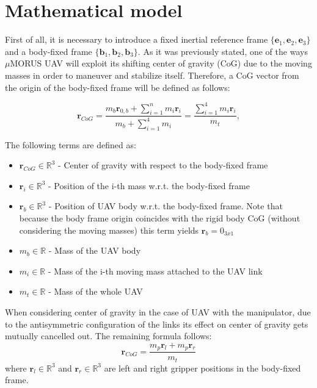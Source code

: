 \section{Mathematical model}
First of all, it is necessary to introduce a fixed inertial reference frame $\{  \textbf{e}_1,  \textbf{e}_2,  \textbf{e}_3  \}$ and a body-fixed frame $ \{  \textbf{b}_1,  \textbf{b}_2,  \textbf{b}_3 \}$. As it was previously stated, one of the ways $\mu$MORUS UAV will exploit its shifting center of gravity (CoG) due to the moving masses in order to maneuver and stabilize itself. Therefore, a CoG vector from the origin of the body-fixed frame will be defined as follows:

\begin{equation}
	\textbf{r}_{CoG} = \frac{m_{b}\textbf{r}_{0,b} + \sum_{i=1}^n m_{i} \textbf{r}_{i}}{m_{b} + \sum_{i=1}^4 m_{i}} = \frac{\sum_{i=1}^4 m_{i}\textbf{r}_{i}}{m_t},
	\label{equ:cog}
\end{equation}

The following terms are defined as: 
\begin{itemize}
	\item $ \textbf{r}_{CoG} \in \mathbb{\text{R}}^3$ - Center of gravity with respect to the body-fixed frame
	
	\item $ \textbf{r}_{i} \in \mathbb{\text{R}}^3$ - Position of the i-th mass w.r.t. the body-fixed frame
	
	\item $ \textbf{r}_{b} \in \mathbb{\text{R}}^3$ - Position of UAV body w.r.t. the body-fixed frame. Note that because the body frame origin coincides with the rigid body CoG (without considering the moving masses) this term yields $ \textbf{r}_b = 0_{3x1}$
	
	\item $m_b \in \mathbb{R}$ - Mass of the UAV body 
	
	\item $m_i \in \mathbb{R}$ - Mass of the i-th moving mass attached to the UAV link
	
	\item $m_t \in \mathbb{R}$ - Mass of the whole UAV
\end{itemize}

When considering center of gravity in the case of UAV with the manipulator, due to the antisymmetric configuration of the links its effect on center of gravity gets mutually cancelled out. The remaining formula follows:
\begin{equation}
	\textbf{r}_{CoG} = \frac{m_p\textbf{r}_l + m_p\textbf{r}_r}{m_t}
\end{equation}
where $\textbf{r}_l \in \mathbb{R}^3$ and $\textbf{r}_r \in \mathbb{R}^3$ are left and right gripper positions in the body-fixed frame. 

